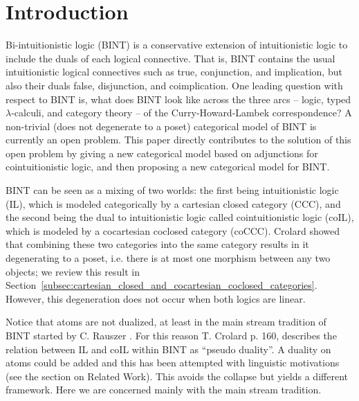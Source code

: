 \documentclass{lmcs}
\begin{document}
\section{Introduction}
\label{sec:introduction}
Bi-intuitionistic logic (BINT) is a conservative extension of
intuitionistic logic to include the duals of each logical connective.
That is, BINT contains the usual intuitionistic logical connectives
such as true, conjunction, and implication, but also their duals
false, disjunction, and coimplication.  One leading question with
respect to BINT is, what does BINT look like across the three arcs --
logic, typed $\lambda$-calculi, and category theory -- of the
Curry-Howard-Lambek correspondence?  A non-trivial (does not
degenerate to a poset) categorical model of BINT is currently an open
problem.  This paper directly contributes to the solution of this open
problem by giving a new categorical model based on adjunctions for
cointuitionistic logic, and then proposing a new categorical model for
BINT.

BINT can be seen as a mixing of two worlds: the first being
intuitionistic logic (IL), which is modeled categorically by a
cartesian closed category (CCC), and the second being the dual to
intuitionistic logic called cointuitionistic logic (coIL), which is
modeled by a cocartesian coclosed category (coCCC).  Crolard
\cite{Crolard:2001} showed that combining these two categories into
the same category results in it degenerating to a poset, i.e.
there is at most one morphism between any two objects; we review this
result in
Section~\ref{subsec:cartesian_closed_and_cocartesian_coclosed_categories}.
However, this degeneration does not occur when both logics are linear.

Notice that atoms are not dualized, at least in the main stream
tradition of BINT started by C. Rauszer \cite{Rauszer:1974,
  Rauszer:1980}. For this reason T. Crolard \cite{Crolard:2001}
p. 160, describes the relation between IL and coIL within BINT as
``pseudo duality''. A duality on atoms could be added and this has
been attempted with linguistic motivations \cite{Bellin:2014} (see the
section on Related Work).  This avoids the collapse but yields a
different framework.  Here we are concerned mainly with the main
stream tradition.
\end{document}
